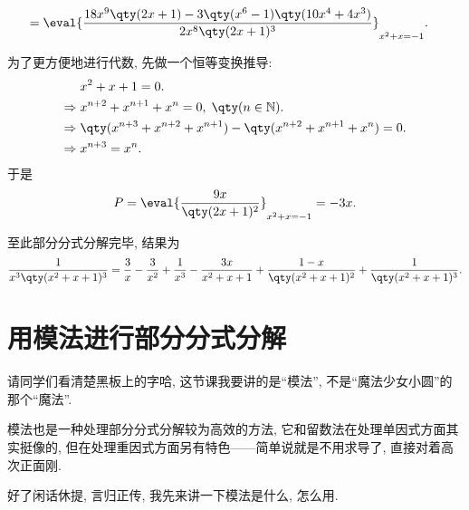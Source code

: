 \documentclass{ctexbook}
\begin{document}
{\begin{align*}
={}&\eval{\frac{18x^{9}\qty(2x+1)-3\qty(x^{6}-1)\qty(10x^{4}+4x^{3})}{2x^{8}\qty(2x+1)^{3}}}_{x^{2}+x=-1}
.\end{align*}\par
为了更方便地进行代数, 先做一个恒等变换推导: 
\begin{align*}
{}&x^{2}+x+1=0.\\
\Rightarrow{}&x^{n+2}+x^{n+1}+x^{n}=0,\;\qty(n\in\mathbb{N}).\\
\Rightarrow{}&\qty(x^{n+3}+x^{n+2}+x^{n+1})-\qty(x^{n+2}+x^{n+1}+x^{n})=0.\\
\Rightarrow{}&x^{n+3}=x^{n}
.\end{align*}
于是
\begin{align*}
P=\eval{\frac{9x}{\qty(2x+1)^{2}}}_{x^{2}+x=-1}=-3x
.\end{align*}\par
至此部分分式分解完毕, 结果为
\begin{align*}
\frac{1}{x^{3}\qty(x^{2}+x+1)^{3}}=\frac{3}{x}-\frac{3}{x^{2}}+\frac{1}{x^{3}}-\frac{3x}{x^{2}+x+1}+\frac{1-x}{\qty(x^{2}+x+1)^{2}}+\frac{1}{\qty(x^{2}+x+1)^{3}}
.\end{align*}\par
\section{用模法进行部分分式分解}
请同学们看清楚黑板上的字哈, 这节课我要讲的是“模法”, 不是“魔法少女小圆”的那个“魔法”. \par
模法也是一种处理部分分式分解较为高效的方法, 它和留数法在处理单因式方面其实挺像的, 但在处理重因式方面另有特色——简单说就是不用求导了, 直接对着高次正面刚. \par
好了闲话休提, 言归正传, 我先来讲一下模法是什么, 怎么用. \par
}
\end{document}
